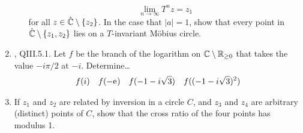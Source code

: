 \documentclass[../psets.tex]{subfiles}
\begin{document}
\begin{enumerate}[ref={A.\arabic*}]
\begin{enumerate}
        \begin{equation*}
            \lim_{n\to\infty}T^nz = z_1
        \end{equation*}
        for all $z\in\hat{\mathbb{C}}\setminus\{z_2\}$. In the case that $|a|=1$, show that every point in $\hat{\mathbb{C}}\setminus\{z_1,z_2\}$ lies on a $T$-invariant M\"{o}bius circle.
    \end{enumerate}
    \item \textcite{bib:FischerLieb}, QIII.5.1. Let $f$ be the branch of the logarithm on $\mathbb{C}\setminus\mathbb{R}_{\geq 0}$ that takes the value $-i\pi/2$ at $-i$. Determine\dots
    \begin{align*}
        f(i)&&
        f(-\text{e}^{})&&
        f(-1-i\sqrt{3})&&
        f((-1-i\sqrt{3})^2)
    \end{align*}
    \item If $z_1$ and $z_2$ are related by inversion in a circle $C$, and $z_3$ and $z_4$ are arbitrary (distinct) points of $C$, show that the cross ratio of the four points has modulus 1.
\end{enumerate}
\end{document}
